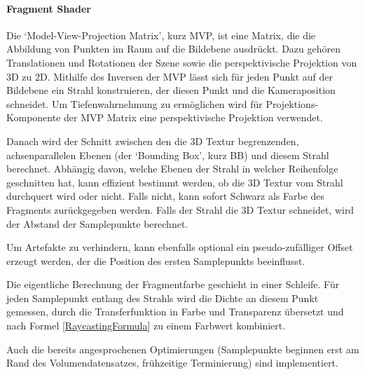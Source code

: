 \documentclass[a4paper,fontsize=12pt,toc=bib,halfparskip]{scrartcl}
\begin{document}
\paragraph{Fragment Shader}
Die `Model-View-Projection Matrix', kurz MVP, ist eine Matrix, die die Abbildung von Punkten im Raum auf die Bildebene ausdr\"uckt. Dazu geh\"oren Translationen und Rotationen der Szene sowie die perspektivische Projektion von 3D zu 2D. Mithilfe des Inversen der MVP l\"asst sich f\"ur jeden Punkt auf der Bildebene ein Strahl konstruieren, der diesen Punkt und die Kameraposition schneidet. Um Tiefenwahrnehmung zu erm\"oglichen wird f\"ur Projektions-Komponente der MVP Matrix eine perspektivische Projektion verwendet.

Danach wird der Schnitt zwischen den die 3D Textur begrenzenden, achsenparallelen Ebenen (der `Bounding Box', kurz BB) und diesem Strahl berechnet. Abh\"angig davon, welche Ebenen der Strahl in welcher Reihenfolge geschnitten hat, kann effizient bestimmt werden, ob die 3D Textur vom Strahl durchquert wird oder nicht. Falls nicht, kann sofort Schwarz als Farbe des Fragments zur\"uckgegeben werden. Falls der Strahl die 3D Textur schneidet, wird der Abstand der Samplepunkte berechnet. 

Um Artefakte zu verhindern, kann ebenfalls optional ein pseudo-zuf\"alliger Offset erzeugt werden, der die Position des ersten Samplepunkts beeinflusst.

Die eigentliche Berechnung der Fragmentfarbe geschieht in einer Schleife. F\"ur jeden Samplepunkt entlang des Strahls wird die Dichte an diesem Punkt gemessen, durch die Transferfunktion in Farbe und Transparenz  \"ubersetzt und nach Formel \ref{RaycastingFormula} zu einem Farbwert kombiniert. 

Auch die bereits angesprochenen Optimierungen (Samplepunkte beginnen erst am Rand des Volumendatensatzes, fr\"uhzeitige Terminierung) sind implementiert.
\end{document}
